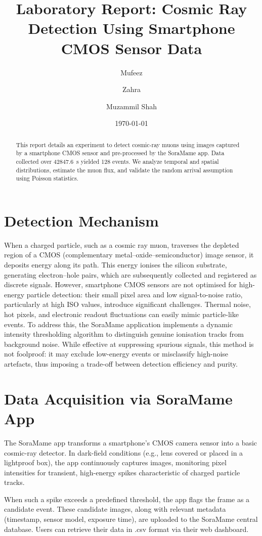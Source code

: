 \documentclass[12pt]{article}
\title{\textbf{Laboratory Report: Cosmic Ray Detection Using Smartphone CMOS Sensor Data}}
\author[]{Mufeez}
\author[]{Zahra}
\author[]{Muzammil Shah}
\affil[]{Department of Physics, Quaid-i-Azam University}
\date{\today}
\begin{document}
	\maketitle	
	
	\begin{abstract}
		This report details an experiment to detect cosmic-ray muons using images captured by a smartphone CMOS sensor and pre-processed by the SoraMame app. Data collected over \SI{42847.6}{\second} yielded \num{128} events. We analyze temporal and spatial distributions, estimate the muon flux, and validate the random arrival assumption using Poisson statistics.
	\end{abstract}
	

	\section{Detection Mechanism}
	When a charged particle, such as a cosmic ray muon, traverses the depleted region of a CMOS (complementary metal–oxide–semiconductor) image sensor, it deposits energy along its path. This energy ionises the silicon substrate, generating electron–hole pairs, which are subsequently collected and registered as discrete signals. However, smartphone CMOS sensors are not optimised for high-energy particle detection: their small pixel area and low signal-to-noise ratio, particularly at high ISO values, introduce significant challenges. Thermal noise, hot pixels, and electronic readout fluctuations can easily mimic particle-like events. To address this, the SoraMame application implements a dynamic intensity thresholding algorithm to distinguish genuine ionisation tracks from background noise. While effective at suppressing spurious signals, this method is not foolproof: it may exclude low-energy events or misclassify high-noise artefacts, thus imposing a trade-off between detection efficiency and purity.
	
	\section{Data Acquisition via SoraMame App}
	
	The SoraMame app transforms a smartphone's CMOS camera sensor into a basic cosmic-ray detector. In dark-field conditions (e.g., lens covered or placed in a lightproof box), the app continuously captures images, monitoring pixel intensities for transient, high-energy spikes characteristic of charged particle tracks.
	
	When such a spike exceeds a predefined threshold, the app flags the frame as a candidate event. These candidate images, along with relevant metadata (timestamp, sensor model, exposure time), are uploaded to the SoraMame central database. Users can retrieve their data in .csv format via their web dashboard.
	
\end{document}
